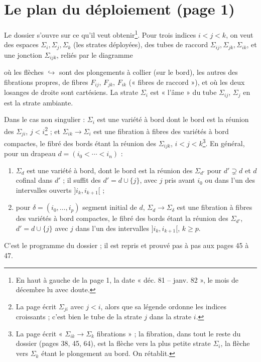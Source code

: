 \documentclass[11pt,a4paper]{article}
\begin{document}
\section*{Le plan du déploiement (page 1)}

Le dossier s'ouvre sur ce qu'il veut obtenir\footnote{En haut à gauche de la
page 1, la date « déc. 81 -- janv. 82 », le mois de décembre lu avec doute.}. Pour
trois indices $i < j < k$, on veut des espaces $\Sigma_i, \Sigma_j, \Sigma_k$ (les
strates déployées), des tubes de raccord $\Sigma_{ij}, \Sigma_{jk}, \Sigma_{ik}$,
et une jonction $\Sigma_{ijk}$, reliés par le diagramme


où les flèches $\hookrightarrow$ sont des plongements à collier (sur le bord), les
autres des fibrations propres, de fibres $F_{ij}$, $F_{jk}$, $F_{ik}$ (« fibres de
raccord »), et où les deux losanges de droite sont cartésiens. La strate
$\Sigma_i$ est « l'âme » du tube $\Sigma_{ij}$, $\Sigma_j$ en est la strate
ambiante.

Dans le cas non singulier : $\Sigma_i$ est une variété à bord dont le bord est la
réunion des $\Sigma_{ji}$, $j < i$\footnote{La page écrit $\Sigma_{ji}$ avec $j<i$,
alors que sa légende ordonne les indices croissants ; c'est bien le tube de la
strate $j$ dans la strate $i$.} ; et $\Sigma_{ik} \to \Sigma_i$ est une fibration à fibres des variétés à bord compactes, le fibré
des bords étant la réunion des $\Sigma_{ijk}$, $i<j<k$\footnote{La page écrit
« $\Sigma_{ik} \to \Sigma_k$ fibrations » ; la fibration, dans tout le reste du
dossier (pages 38, 45, 64), est la flèche vers la plus petite strate $\Sigma_i$, la
flèche vers $\Sigma_k$ étant le plongement au bord. On rétablit.}. En général, pour
un drapeau $d = (i_0 < \cdots < i_n)$ :
\begin{enumerate}
\item[a)] $\Sigma_d$ est une variété à bord, dont le bord est la réunion des
$\Sigma_{d'}$ pour $d' \supsetneq d$ et $d$ cofinal dans $d'$ ; il suffit des $d' = d
\cup \{j\}$, avec $j$ pris avant $i_0$ ou dans l'un des intervalles ouverts $]i_k,
i_{k+1}[$ ;
\item[b)] pour $\delta = (i_0, …, i_p)$ segment initial de $d$, $\Sigma_d \to
\Sigma_\delta$ est une fibration à fibres des variétés à bord compactes, le fibré
des bords étant la réunion des $\Sigma_{d'}$, $d' = d \cup \{j\}$ avec $j$ dans l'un des
intervalles $]i_k, i_{k+1}[$, $k \geq p$.
\end{enumerate}
C'est le programme du dossier ; il est repris et prouvé pas à pas aux pages 45 à
47.
\end{document}
